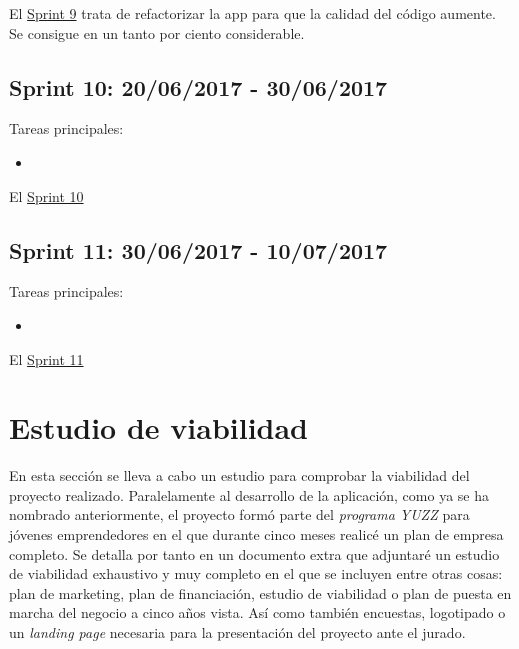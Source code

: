 
El \underline{Sprint 9} trata de refactorizar la app para que la calidad del código aumente. Se consigue en un tanto por ciento considerable. 

\subsection{Sprint 10: 20/06/2017 - 30/06/2017}\label{sprint10}

Tareas principales:

\begin{itemize}
	\item 
\end{itemize}


El \underline{Sprint 10} 

\subsection{Sprint 11: 30/06/2017 - 10/07/2017}\label{sprint11}

Tareas principales:

\begin{itemize}
	\item 
\end{itemize}


El \underline{Sprint 11} 


\section{Estudio de viabilidad}\label{estudio-viabilidad}
En esta sección se lleva a cabo un estudio para comprobar la viabilidad del proyecto realizado. Paralelamente al desarrollo de la aplicación, como ya se ha nombrado anteriormente, el proyecto formó parte del \emph{programa YUZZ } para jóvenes emprendedores en el que durante cinco meses realicé un plan de empresa completo. Se detalla por tanto en un documento extra que adjuntaré un estudio de viabilidad exhaustivo  y muy completo en el que se incluyen entre otras cosas: plan de marketing, plan de financiación, estudio de viabilidad o plan de puesta en marcha del negocio a cinco años vista. Así como también encuestas, logotipado o un \emph{landing page} necesaria para la presentación del proyecto ante el jurado. 

